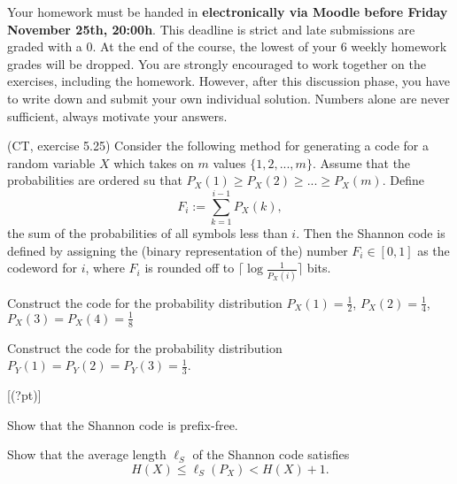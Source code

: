 \documentclass[a4paper,10pt,landscape,twocolumn]{scrartcl}
\newcommand\deadline{Friday November 25th, 20:00h}
\begin{document}
\homeworkproblems

{\sffamily\noindent
Your homework must be handed in \textbf{electronically via Moodle before \deadline}. This deadline is strict and late submissions are graded with a 0. At the end of the course, the lowest of your 6 weekly homework grades will be dropped. You are strongly encouraged to work together on the exercises, including the homework. However, after this discussion phase, you have to write down and submit your own individual solution. Numbers alone are never sufficient, always motivate your answers.
}

\begin{exercise}
(CT, exercise 5.25) Consider the following method for generating a code for a random variable $X$ which takes on $m$ values $\{1,2,...,m\}$. Assume that the probabilities are ordered su that $P_X(1) \geq P_X(2) \geq ... \geq P_X(m)$. Define
\[
F_i := \sum_{k=1}^{i-1} P_X(k),
\]
the sum of the probabilities of all symbols less than $i$. Then the Shannon code is defined by assigning the (binary representation of the) number $F_i \in [0,1]$ as the codeword for $i$, where $F_i$ is rounded off to $\lceil \log\frac{1}{P_X(i)}\rceil$ bits.
	\begin{subex}[(1pt)]
	Construct the code for the probability distribution $P_X(1) = \frac{1}{2}$, $P_X(2) = \frac{1}{4}$, $P_X(3) = P_X(4) = \frac{1}{8}$
	\end{subex}
	\begin{subex}[(1pt)]
	Construct the code for the probability distribution $P_Y(1) = P_Y(2) = P_Y(3) = \frac{1}{3}$.
	\end{subex}[(?pt)]
	\begin{subex}
	Show that the Shannon code is prefix-free.
	\end{subex}
	\begin{subex}
	Show that the average length $\ell_S$ of the Shannon code satisfies
	\[
	H(X) \leq \ell_S(P_X) < H(X) + 1.
	\]
	\end{subex}
\end{exercise}



\newcommand{\typsetA}{A^{(n)}_{\varepsilon}}
\newcommand{\typsetB}{B^{(n)}_{\delta}}
\end{document}

